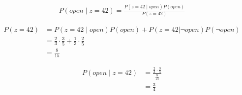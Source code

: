 \subsection{}

\begin{align*}
P(open \mid z = 42) = \frac{P(z=42 \mid open) P(open)}{P(z = 42)}
\end{align*}

\begin{align*}
P(z=42) &= P(z=42 \mid open)P(open) + P(z=42 | \neg open) P(\neg open) \\
&= \frac{2}{3} \cdot \frac{3}{5} + \frac{1}{3} \cdot \frac{2}{5} \\
&= \frac{8}{15}
\end{align*}

\begin{align*}
P(open \mid z=42) &= \frac{\frac{2}{3} \cdot \frac{3}{5}}{\frac{8}{15}} \\
&= \frac{3}{4}
\end{align*}
